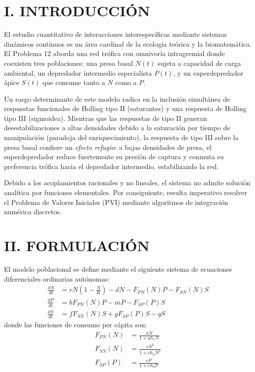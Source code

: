 \documentclass[10pt,twocolumn,a4paper]{article}
\begin{document}
\section{I. INTRODUCCIÓN}
El estudio cuantitativo de interacciones interespecíficas mediante sistemas dinámicos continuos es un área cardinal de la ecología teórica y la biomatemática. El Problema 12 aborda una red trófica con omnivoría intragremial donde coexisten tres poblaciones: una presa basal $N(t)$ sujeta a capacidad de carga ambiental, un depredador intermedio especialista $P(t)$, y un superdepredador ápice $S(t)$ que consume tanto a $N$ como a $P$.

Un rasgo determinante de este modelo radica en la inclusión simultánea de respuestas funcionales de Holling tipo II (saturantes) y una respuesta de Holling tipo III (sigmoidea). Mientras que las respuestas de tipo II generan desestabilizaciones a altas densidades debido a la saturación por tiempo de manipulación (paradoja del enriquecimiento), la respuesta de tipo III sobre la presa basal confiere un \textit{efecto refugio}: a bajas densidades de presa, el superdepredador reduce fuertemente su presión de captura y conmuta su preferencia trófica hacia el depredador intermedio, estabilizando la red.

Debido a los acoplamientos racionales y no lineales, el sistema no admite solución analítica por funciones elementales. Por consiguiente, resulta imperativo resolver el Problema de Valores Iniciales (PVI) mediante algoritmos de integración numérica discretos.

\section{II. FORMULACIÓN}
El modelo poblacional se define mediante el siguiente sistema de ecuaciones diferenciales ordinarias autónomas:
\begin{align}
  \frac{dN}{dt} &= r N \left(1 - \frac{N}{K}\right) - d N - F_{PN}(N) P - F_{SN}(N) S \label{eq:presa} \\
  \frac{dP}{dt} &= b F_{PN}(N) P - m P - F_{SP}(P) S \label{eq:depredador} \\
  \frac{dS}{dt} &= f F_{SN}(N) S + g F_{SP}(P) S - q S \label{eq:super}
\end{align}
donde las funciones de consumo per cápita son:
\begin{align}
  F_{PN}(N) &= \frac{a N}{1 + a h_1 N} \label{eq:fpn} \\
  F_{SN}(N) &= \frac{c N^2}{1 + c h_2 N^2} \label{eq:fsn} \\
  F_{SP}(P) &= \frac{e P}{1 + e h_3 P} \label{eq:fsp}
\end{align}
\end{document}
